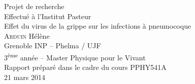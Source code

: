 \documentclass[a4paper,11pt]{article}
\title{}
\author{}
\begin{document}

\thispagestyle{empty}

\begin{center}

        \makebox[\textwidth][l]{
        }

        \makebox[\textwidth][r]{
			\raisebox{30pt}[0pt][0pt]{
			}
        }

        \vspace{3cm}
        {\huge Projet de recherche}\\
        \vspace{0.5cm}
        {\large Effectu\'e \`a l'Institut Pasteur}\\
        \vspace{3cm}
        {\Huge Effet du virus de la grippe sur les infections à pneumocoque}\\

        \vspace{3.5cm}
        {\large A{\textsc {rduin}} H\'el\`ene}\\
        {\large Grenoble INP -- Phelma / UJF}\\
        {\large 3{\textsuperscript {\`eme}} ann\'ee -- Master Physique pour le Vivant}\\

        \vspace{4cm}
        Rapport préparé dans le cadre du cours PPHY541A\\
        21 mars 2014\\

\end{center}

\clearpage
\end{document}
